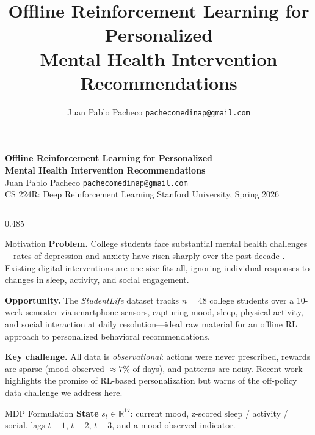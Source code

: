 \documentclass[final]{beamer}
\title{
  \textbf{Offline Reinforcement Learning for Personalized\\
  Mental Health Intervention Recommendations}
}
\author{Juan Pablo Pacheco \quad \texttt{pachecomedinap@gmail.com}}
\institute{CS 224R: Deep Reinforcement Learning \quad Stanford University, Spring 2026}
\date{}
\begin{document}
\begin{frame}[t]{}

\vspace{0.4cm}
\begin{center}
  {\LARGE\bfseries Offline Reinforcement Learning for Personalized\\[0.2ex]
   Mental Health Intervention Recommendations}\\[0.6em]
  {\large Juan Pablo Pacheco \quad \texttt{pachecomedinap@gmail.com}}\\[0.3em]
  {\normalsize CS 224R: Deep Reinforcement Learning \quad Stanford University, Spring 2026}
\end{center}
\vspace{0.6cm}

\begin{columns}[T]

\begin{column}{0.485\linewidth}

\begin{block}{Motivation}
\justifying
\textbf{Problem.}
College students face substantial mental health challenges—rates of depression
and anxiety have risen sharply over the past decade \citep{lipson2022depression}.
Existing digital interventions are one-size-fits-all, ignoring individual
responses to changes in sleep, activity, and social engagement.

\textbf{Opportunity.}
The \textit{StudentLife} dataset \citep{wang2014studentlife} tracks $n{=}48$
college students over a 10-week semester via smartphone sensors, capturing
mood, sleep, physical activity, and social interaction at daily
resolution—ideal raw material for an offline RL approach to personalized
behavioral recommendations.

\textbf{Key challenge.}
All data is \emph{observational}: actions were never prescribed, rewards are
sparse (mood observed $\approx7\%$ of days), and patterns are noisy.
Recent work \citep{arevalo2025rl} highlights the promise of RL-based
personalization but warns of the off-policy data challenge we address here.
\end{block}

\begin{block}{MDP Formulation}
\justifying
\textbf{State} $s_t \in \mathbb{R}^{17}$: current mood, z-scored sleep / activity /
social, lags $t{-}1$, $t{-}2$, $t{-}3$, and a mood-observed indicator.


\end{block}
\end{column}
\end{columns}
\end{frame}
\end{document}
